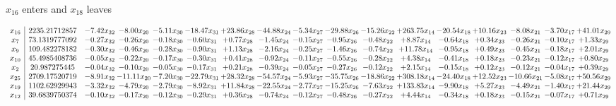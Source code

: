 \documentclass[9pt]{article}
\begin{document}
 $ x_{16} $ enters and $ x_{18} $ leaves 

 \[\begin{array}{c| c c@{\hskip 2pt} c@{\hskip 2pt} c@{\hskip 2pt} c@{\hskip 2pt} c@{\hskip 2pt} c@{\hskip 2pt} c@{\hskip 2pt} c@{\hskip 2pt} c@{\hskip 2pt} c@{\hskip 2pt} c@{\hskip 2pt} c@{\hskip 2pt} c@{\hskip 2pt} c@{\hskip 2pt} c@{\hskip 2pt} }
 x_{16}   &  2235.21712857 & -7.42 x_{32} & -8.00 x_{20} & -5.11 x_{30} & -18.47 x_{31} & + 23.86 x_{28} & -44.88 x_{24} & -5.34 x_{27} & -29.88 x_{26} & -15.26 x_{22} & + 263.75 x_{14} & -20.54 x_{18} & + 10.16 x_{23} & -8.08 x_{21} & -3.70 x_{17} & + 41.01 x_{29}\\
 x_{7}   &  73.1319777092 & -0.27 x_{32} & -0.26 x_{20} & -0.18 x_{30} & -0.60 x_{31} & +  0.77 x_{28} & -1.45 x_{24} & -0.15 x_{27} & -0.95 x_{26} & -0.48 x_{22} & +  8.87 x_{14} & -0.64 x_{18} & +  0.34 x_{23} & -0.26 x_{21} & -0.10 x_{17} & +  1.33 x_{29}\\
 x_{9}   &  109.482278182 & -0.30 x_{32} & -0.46 x_{20} & -0.28 x_{30} & -0.90 x_{31} & +  1.13 x_{28} & -2.16 x_{24} & -0.25 x_{27} & -1.46 x_{26} & -0.74 x_{22} & + 11.78 x_{14} & -0.95 x_{18} & +  0.49 x_{23} & -0.45 x_{21} & -0.18 x_{17} & +  2.01 x_{29}\\
 x_{10}   &  45.4985408736 & -0.05 x_{32} & -0.22 x_{20} & -0.17 x_{30} & -0.30 x_{31} & +  0.41 x_{28} & -0.92 x_{24} & -0.11 x_{27} & -0.55 x_{26} & -0.28 x_{22} & +  4.38 x_{14} & -0.41 x_{18} & +  0.18 x_{23} & -0.23 x_{21} & -0.12 x_{17} & +  0.80 x_{29}\\
 x_{2}   &  20.987275445 & -0.04 x_{32} & -0.10 x_{20} & -0.05 x_{30} & -0.17 x_{31} & +  0.21 x_{28} & -0.39 x_{24} & -0.05 x_{27} & -0.27 x_{26} & -0.12 x_{22} & +  2.15 x_{14} & -0.15 x_{18} & +  0.12 x_{23} & -0.12 x_{21} & -0.04 x_{17} & +  0.39 x_{29}\\
 x_{25}   &  2709.17520719 & -8.91 x_{32} & -11.11 x_{20} & -7.20 x_{30} & -22.79 x_{31} & + 28.32 x_{28} & -54.57 x_{24} & -5.93 x_{27} & -35.75 x_{26} & -18.86 x_{22} & + 308.18 x_{14} & -24.40 x_{18} & + 12.52 x_{23} & -10.66 x_{21} & -5.08 x_{17} & + 50.56 x_{29}\\
 x_{19}   &  1102.62929943 & -3.32 x_{32} & -4.79 x_{20} & -2.79 x_{30} & -8.92 x_{31} & + 11.84 x_{28} & -22.55 x_{24} & -2.77 x_{27} & -15.25 x_{26} & -7.63 x_{22} & + 133.83 x_{14} & -9.90 x_{18} & +  5.27 x_{23} & -4.49 x_{21} & -1.40 x_{17} & + 21.44 x_{29}\\
 x_{12}   &  39.6839750374 & -0.10 x_{32} & -0.17 x_{20} & -0.12 x_{30} & -0.29 x_{31} & +  0.36 x_{28} & -0.74 x_{24} & -0.12 x_{27} & -0.48 x_{26} & -0.27 x_{22} & +  4.44 x_{14} & -0.34 x_{18} & +  0.18 x_{23} & -0.15 x_{21} & -0.07 x_{17} & +  0.71 x_{29}\\

\end{array}\]
\end{document}
